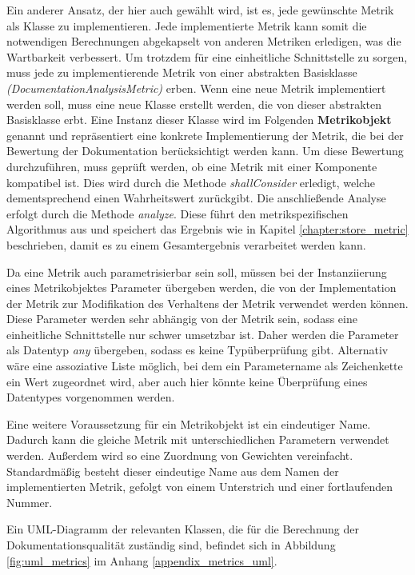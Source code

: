 Ein anderer Ansatz, der hier auch gewählt wird, ist es, jede gewünschte Metrik als Klasse zu implementieren. Jede implementierte Metrik kann somit die notwendigen Berechnungen abgekapselt von anderen Metriken erledigen, was die Wartbarkeit verbessert. Um trotzdem für eine einheitliche Schnittstelle zu sorgen, muss jede zu implementierende Metrik von einer abstrakten Basisklasse \textit{(DocumentationAnalysisMetric)} erben. Wenn eine neue Metrik implementiert werden soll, muss eine neue Klasse erstellt werden, die von dieser abstrakten Basisklasse erbt. Eine Instanz dieser Klasse wird im Folgenden \textbf{Metrikobjekt} genannt und repräsentiert eine konkrete Implementierung der Metrik, die bei der Bewertung der Dokumentation berücksichtigt werden kann. Um diese Bewertung durchzuführen, muss geprüft werden, ob eine Metrik mit einer Komponente kompatibel ist. Dies wird durch die  Methode \textit{shallConsider} erledigt,  welche dementsprechend einen Wahrheitswert zurückgibt. Die anschließende Analyse erfolgt durch die Methode \textit{analyze}. Diese führt den metrikspezifischen Algorithmus aus und speichert das Ergebnis wie in Kapitel \ref{chapter:store_metric} beschrieben, damit es zu einem Gesamtergebnis verarbeitet werden kann.

Da eine Metrik auch parametrisierbar sein soll, müssen bei der Instanziierung  eines Metrikobjektes Parameter übergeben werden, die von der Implementation der Metrik zur Modifikation des Verhaltens der Metrik verwendet werden können. Diese Parameter werden sehr abhängig von der Metrik sein, sodass eine einheitliche Schnittstelle nur schwer umsetzbar ist. Daher werden die Parameter als Datentyp \textit{any} übergeben, sodass es keine Typüberprüfung gibt. Alternativ wäre eine assoziative Liste möglich, bei dem ein Parametername als Zeichenkette ein Wert zugeordnet wird, aber auch hier könnte keine Überprüfung eines Datentypes vorgenommen werden. 

Eine  weitere Voraussetzung für ein Metrikobjekt ist ein eindeutiger Name. Dadurch kann die gleiche Metrik mit unterschiedlichen Parametern verwendet werden. Außerdem wird so eine Zuordnung von Gewichten vereinfacht. Standardmäßig besteht dieser eindeutige Name aus dem Namen der implementierten Metrik, gefolgt von einem Unterstrich und einer fortlaufenden Nummer. 

Ein UML-Diagramm der relevanten Klassen, die für die Berechnung der Dokumentationsqualität zuständig sind, befindet sich in Abbildung \ref{fig:uml_metrics} im Anhang \ref{appendix_metrics_uml}.


